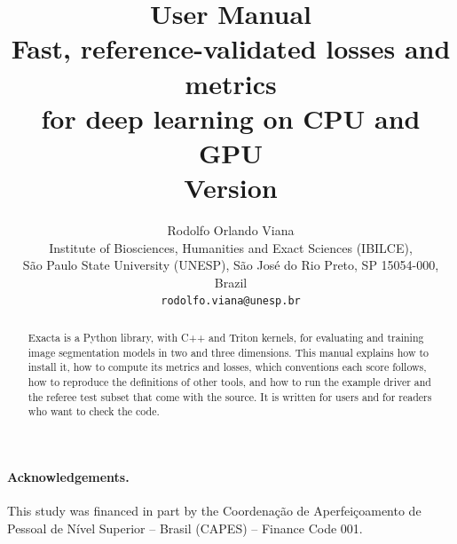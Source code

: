 \documentclass[11pt,a4paper]{report}
\title{\exacta{} User Manual\\[0.4em]
  \large Fast, reference-validated losses and metrics\\ for deep learning on CPU and GPU\\[0.8em]
  Version \exactaversion}
\author{Rodolfo Orlando Viana\\[0.3em]
  \normalsize Institute of Biosciences, Humanities and Exact Sciences (IBILCE),\\
  \normalsize S\~ao Paulo State University (UNESP), S\~ao Jos\'e do Rio Preto, SP 15054-000, Brazil\\
  \normalsize\texttt{rodolfo.viana@unesp.br}}
\date{}
\renewcommand{\_}{\textunderscoreorig\allowbreak}
\begin{document}
\maketitle

\begin{abstract}
\noindent
Exacta is a Python library, with C++ and Triton kernels, for evaluating and training image
segmentation models in two and three dimensions. This manual explains how to install it, how
to compute its metrics and losses, which conventions each score follows, how to reproduce the
definitions of other tools, and how to run the example driver and the referee test subset that
come with the source. It is written for users and for readers who want to check the code.
\end{abstract}

\paragraph{Acknowledgements.}
This study was financed in part by the Coordena\c{c}\~ao de Aperfei\c{c}oamento de Pessoal de
N\'ivel Superior -- Brasil (CAPES) -- Finance Code 001.

\tableofcontents













\end{document}
